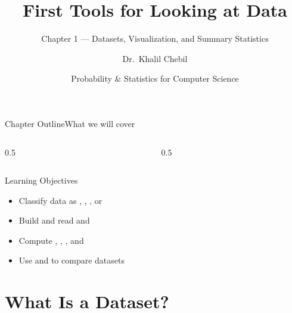 \documentclass[aspectratio=169,11pt]{beamer}
\title[Ch.\,1 — First Tools for Data]{First Tools for Looking at Data}
\subtitle{Chapter 1 — Datasets, Visualization, and Summary Statistics}
\author{Dr.\ Khalil Chebil}
\date{Probability \& Statistics for Computer Science}
\begin{document}
{
\begin{frame}
  \titlepage
\end{frame}}

\begin{frame}{Chapter Outline}{What we will cover}
  \begin{columns}[T]
    \begin{column}{0.5\textwidth}
      \tableofcontents[sections={1-4}]
    \end{column}
    \begin{column}{0.5\textwidth}
      \tableofcontents[sections={5-7}]
    \end{column}
  \end{columns}
  \vfill
  \begin{block}{Learning Objectives}
    \begin{itemize}
      \item Classify data as , , , or 
      \item Build and read  and 
      \item Compute , , , and 
      \item Use  and  to compare datasets
    \end{itemize}
  \end{block}
\end{frame}

\section{What Is a Dataset?}
\end{document}
